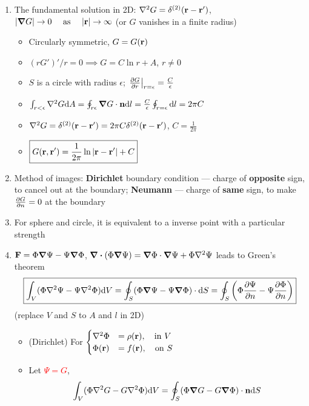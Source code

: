 \documentclass{article}
\theoremstyle{remark}
\theoremstyle{remark}
\begin{document}
\begin{enumerate}
        \item The fundamental solution in 2D: $\laplacian{G}=\delta^{(2)}(\vb{r}-\vb{r}')$, $|\grad G|\rightarrow0\ \qas\ |\vb{r}|\rightarrow \infty$ (or $G$ vanishes in a finite radius)\begin{itemize}
            \item Circularly symmetric, $G=G(\vb{r})$
            \item $(rG')'/r=0\implies G=C\ln r+A$, $r\neq 0$
            \item $S$ is a circle with radius $\epsilon$; $\eval{\pdv{G}{r}}_{r=\epsilon} = \frac{C}{\epsilon}$
            \item $\int_{r<\epsilon}\laplacian{G}\dd A=\oint_{r\epsilon}\grad G\cdot\vb{n}\dd l=\frac{C}{\epsilon}\oint_{r=\epsilon}\dd l=2\pi C$
            \item $\laplacian{G}=\delta^{(2)}(\vb{r}-\vb{r}')=2\pi C\delta^{(2)}(\vb{r}-\vb{r}')$, $C=\frac{1}{2\pi}$
            \item $\boxed{G(\vb{r},\vb{r}')=\frac{1}{2\pi}\ln|\vb{r}-\vb{r}'|+C}$
        \end{itemize}
        \item Method of images: \textbf{Dirichlet} boundary condition --- charge of \textbf{opposite} sign, to cancel out at the boundary; \textbf{Neumann} --- charge of \textbf{same} sign, to make $\pdv{G}{n}=0$ at the boundary
        \item For sphere and circle, it is equivalent to a inverse point with a particular strength
        \item $\vb{F}=\Phi\grad\Psi-\Psi\grad\Phi$, $\div(\Phi\grad\Psi)=\grad\Phi\cdot\grad\Psi+\Phi\laplacian{\Psi}$ leads to Green's theorem\[
            \boxed{\int_V(\Phi\laplacian{\Psi}-\Psi\laplacian{\Phi})\dd V=\oint_S(\Phi\grad\Psi-\Psi\grad\Phi)\cdot\dd S=\oint_S\left(\Phi\pdv{\Psi}{n}-\Psi\pdv{\Phi}{n}\right)}
        \] (replace $V$ and $S$ to $A$ and $l$ in 2D)\begin{itemize}
            \item (Dirichlet) For $\begin{cases}
                \laplacian{\Phi}&=\rho(\vb{r}),\quad \mathrm{in}\ V\\
                \Phi(\vb{r})&=f(\vb{r}),\quad \mathrm{on}\ S\\
            \end{cases}$
            \item Let \textcolor{red}{$\Psi=G$}, \begin{align*}
                \int_V (\Phi\laplacian{G}-G\laplacian{\Phi})\dd V &= \oint_S(\Phi\grad G-G\grad\Phi)\cdot\vb{n}\dd S\\

\end{align*}
\end{itemize}
\end{enumerate}
\end{document}
